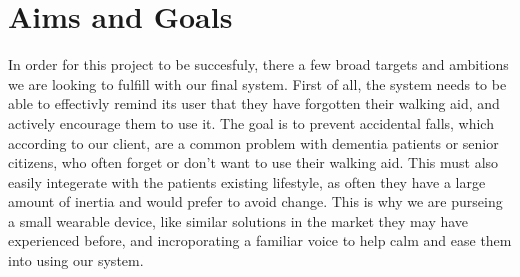 \section{Aims and Goals}
	In order for this project to be succesfuly, there a few broad targets and ambitions we are looking to fulfill with our final system.
First of all, the system needs to be able to effectivly remind its user that they have forgotten their walking aid, and actively encourage them to use it. The goal is to prevent accidental falls, which according to our client, are a common problem with dementia patients or senior citizens, who often forget or don't want to use their walking aid. This must also easily integerate with the patients existing lifestyle, as often they have a large amount of inertia and would prefer to avoid change. This is why we are purseing a small wearable device, like similar solutions in the market they may have experienced before, and incroporating a familiar voice to help calm and ease them into using our system.
